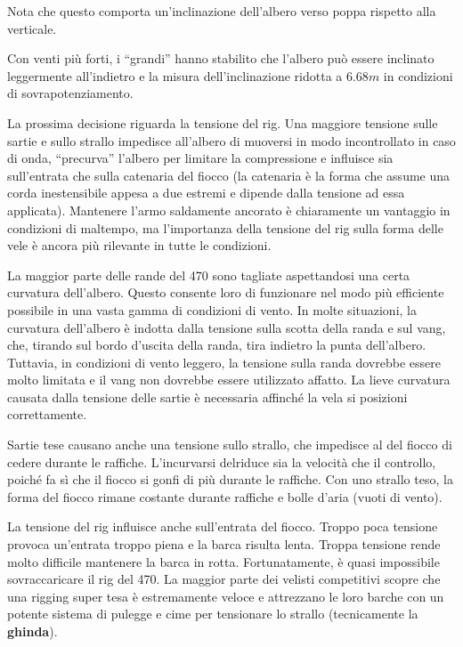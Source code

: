Nota che questo comporta un'inclinazione dell'albero verso poppa rispetto alla
verticale.

Con venti più forti, i ``grandi'' hanno stabilito che l'albero può essere
inclinato leggermente all'indietro e la misura dell'inclinazione ridotta a
$6.68\si{m}$ in condizioni di sovrapotenziamento.

La prossima decisione riguarda la tensione del rig. Una maggiore tensione sulle
sartie e sullo strallo impedisce all'albero di muoversi in modo incontrollato in
caso di onda, ``precurva'' l'albero per limitare la compressione e influisce sia
sull'entrata che sulla catenaria del fiocco (la catenaria è la forma che assume
una corda inestensibile appesa a due estremi e dipende dalla tensione ad essa
applicata). Mantenere l'armo saldamente ancorato è chiaramente un vantaggio
in condizioni di maltempo, ma l'importanza della tensione del rig sulla
forma delle vele è ancora più rilevante in tutte le condizioni.

La maggior parte delle rande del 470 sono tagliate aspettandosi una certa
curvatura dell'albero. Questo consente loro di funzionare nel modo
più efficiente possibile in una vasta gamma di condizioni di vento. In molte
situazioni, la curvatura dell'albero è indotta dalla tensione sulla scotta della
randa e sul vang, che, tirando sul bordo d'uscita della randa, tira indietro la
punta dell'albero. Tuttavia, in condizioni di vento leggero, la tensione sulla
randa dovrebbe essere molto limitata e il vang non dovrebbe essere utilizzato
affatto. La lieve curvatura causata dalla tensione delle sartie è necessaria
affinché la vela si posizioni correttamente.

Sartie tese causano anche una tensione sullo strallo, che impedisce al\theluff
del fiocco di cedere durante le raffiche. L'incurvarsi del\theluff riduce sia la
velocità che il controllo, poiché fa sì che il fiocco si gonfi di più durante le
raffiche. Con uno strallo teso, la forma del fiocco rimane costante durante
raffiche e bolle d'aria (vuoti di vento).

La tensione del rig influisce anche sull'entrata del fiocco. Troppo poca
tensione provoca un'entrata troppo piena e la barca risulta lenta. Troppa
tensione rende molto difficile mantenere la barca in rotta.
Fortunatamente, è quasi impossibile sovraccaricare il rig del 470. La maggior
parte dei velisti competitivi scopre che una rigging super tesa è estremamente
veloce e attrezzano le loro barche con un potente sistema di pulegge e cime per
tensionare lo strallo (tecnicamente la \textbf{ghinda}).

